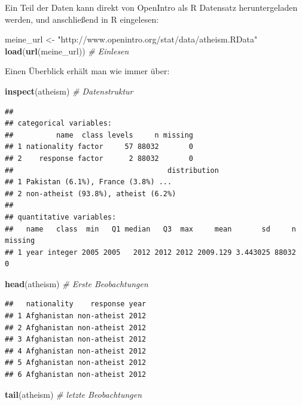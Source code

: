 \documentclass[12pt,ngerman,paper=a4,pagesize,DIV=13]{scrreprt}
\newenvironment{Shaded}{\begin{snugshade}}{\end{snugshade}}
\newcommand{\CommentTok}[1]{\textcolor[rgb]{0.56,0.35,0.01}{\textit{#1}}}
\newcommand{\KeywordTok}[1]{\textcolor[rgb]{0.13,0.29,0.53}{\textbf{#1}}}
\newcommand{\NormalTok}[1]{#1}
\newcommand{\StringTok}[1]{\textcolor[rgb]{0.31,0.60,0.02}{#1}}
\begin{document}
Ein Teil der Daten kann direkt von OpenIntro als R Datensatz
heruntergeladen werden, und anschließend in R eingelesen:

\begin{Shaded}
\begin{Highlighting}[]
\NormalTok{meine_url <-}\StringTok{ "http://www.openintro.org/stat/data/atheism.RData"}
\KeywordTok{load}\NormalTok{(}\KeywordTok{url}\NormalTok{(meine_url)) }\CommentTok{# Einlesen}
\end{Highlighting}
\end{Shaded}

Einen Überblick erhält man wie immer über:

\begin{Shaded}
\begin{Highlighting}[]
\KeywordTok{inspect}\NormalTok{(atheism) }\CommentTok{# Datenstruktur}
\end{Highlighting}
\end{Shaded}

\begin{verbatim}
## 
## categorical variables:  
##          name  class levels     n missing
## 1 nationality factor     57 88032       0
## 2    response factor      2 88032       0
##                                    distribution
## 1 Pakistan (6.1%), France (3.8%) ...           
## 2 non-atheist (93.8%), atheist (6.2%)          
## 
## quantitative variables:  
##   name   class  min   Q1 median   Q3  max     mean       sd     n missing
## 1 year integer 2005 2005   2012 2012 2012 2009.129 3.443025 88032       0
\end{verbatim}

\begin{Shaded}
\begin{Highlighting}[]
\KeywordTok{head}\NormalTok{(atheism) }\CommentTok{# Erste Beobachtungen}
\end{Highlighting}
\end{Shaded}

\begin{verbatim}
##   nationality    response year
## 1 Afghanistan non-atheist 2012
## 2 Afghanistan non-atheist 2012
## 3 Afghanistan non-atheist 2012
## 4 Afghanistan non-atheist 2012
## 5 Afghanistan non-atheist 2012
## 6 Afghanistan non-atheist 2012
\end{verbatim}

\begin{Shaded}
\begin{Highlighting}[]
\KeywordTok{tail}\NormalTok{(atheism) }\CommentTok{# letzte Beobachtungen}
\end{Highlighting}
\end{Shaded}
\end{document}
